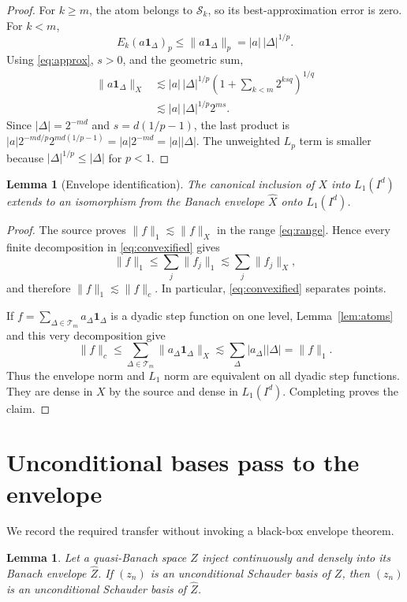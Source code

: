 \documentclass[10pt]{article}
\newtheorem{lemma}[theorem]{Lemma}
\newcommand{\one}{\mathbf 1}
\begin{document}
\begin{proof}
For $k\geq m$, the atom belongs to $\mathcal S_k$, so its best-approximation
error is zero.  For $k<m$,
\[
 E_k(a\one_\Delta)_p\leq\|a\one_\Delta\|_p
 =|a|\,|\Delta|^{1/p}.
\]
Using \eqref{eq:approx}, $s>0$, and the geometric sum,
\begin{align*}
 \|a\one_\Delta\|_X
 &\lesssim |a|\,|\Delta|^{1/p}
 \left(1+\sum_{k<m}2^{ksq}\right)^{1/q} \\
 &\lesssim |a|\,|\Delta|^{1/p}2^{ms}.
\end{align*}
Since $|\Delta|=2^{-md}$ and $s=d(1/p-1)$, the last product is
$|a|2^{-md/p}2^{md(1/p-1)}=|a|2^{-md}=|a||\Delta|$.
The unweighted $L_p$ term is smaller because
$|\Delta|^{1/p}\leq|\Delta|$ for $p<1$.
\end{proof}

\begin{lemma}[Envelope identification]\label{lem:envelope}
The canonical inclusion of $X$ into $L_1(I^d)$ extends to an isomorphism
from the Banach envelope $\widehat X$ onto $L_1(I^d)$.
\end{lemma}

\begin{proof}
The source proves $\|f\|_1\lesssim\|f\|_X$ in the range
\eqref{eq:range}.  Hence every finite decomposition in
\eqref{eq:convexified} gives
\[
 \|f\|_1\leq\sum_j\|f_j\|_1\lesssim\sum_j\|f_j\|_X,
\]
and therefore $\|f\|_1\lesssim\|f\|_c$.  In particular,
\eqref{eq:convexified} separates
points.

If $f=\sum_{\Delta\in\mathcal T_m}a_\Delta\one_\Delta$ is a dyadic step
function on one level, Lemma~\ref{lem:atoms} and this very decomposition give
\[
 \|f\|_c\leq\sum_{\Delta\in\mathcal T_m}
 \|a_\Delta\one_\Delta\|_X
 \lesssim\sum_\Delta |a_\Delta||\Delta|=\|f\|_1.
\]
Thus the envelope norm and $L_1$ norm are equivalent on all dyadic step
functions.  They are dense in $X$ by the source and dense in $L_1(I^d)$.
Completing proves the claim.
\end{proof}

\section{Unconditional bases pass to the envelope}

We record the required transfer without invoking a black-box envelope
theorem.

\begin{lemma}\label{lem:transfer}
Let a quasi-Banach space $Z$ inject continuously and densely into its Banach
envelope $\widehat Z$.  If $(z_n)$ is an unconditional Schauder basis of
$Z$, then $(z_n)$ is an unconditional Schauder basis of $\widehat Z$.
\end{lemma}
\end{document}
